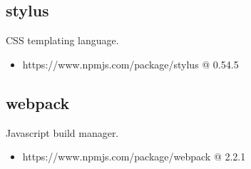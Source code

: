   \subsection{stylus}
  CSS templating language.
  \begin{itemize}
    \item https://www.npmjs.com/package/stylus @ 0.54.5
  \end{itemize}

  \subsection{webpack}
  Javascript build manager.
  \begin{itemize}
    \item https://www.npmjs.com/package/webpack @ 2.2.1
  \end{itemize}






